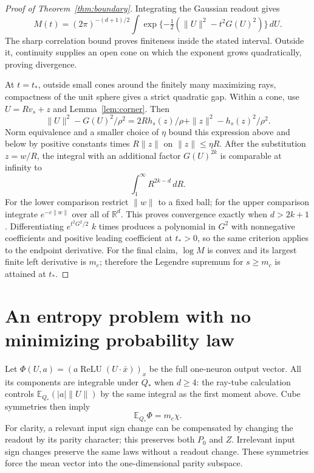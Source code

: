 \documentclass[11pt]{article}
\newcommand{\E}{\mathbb E}
\newcommand{\relu}{\operatorname{ReLU}}
\begin{document}
\begin{proof}[Proof of Theorem~\ref{thm:boundary}]
Integrating the Gaussian readout gives
\[
 M(t)=(2\pi)^{-(d+1)/2}\int
       \exp\{-\tfrac12(\|U\|^2-t^2G(U)^2)\}\,dU.
\]
The sharp correlation bound proves finiteness inside the stated interval.
Outside it, continuity supplies an open cone on which the exponent grows
quadratically, proving divergence.

At $t=t_*$, outside small cones around the finitely many maximizing rays,
compactness of the unit sphere gives a strict quadratic gap. Within a
cone, use $U=Rv_s+z$ and Lemma~\ref{lem:corner}. Then
\[
 \|U\|^2-G(U)^2/\rho^2
 =2Rh_s(z)/\rho+\|z\|^2-h_s(z)^2/\rho^2.
\]
Norm equivalence and a smaller choice of $\eta$ bound this expression
above and below by positive constants times $R\|z\|$ on
$\|z\|\le\eta R$. After the substitution $z=w/R$, the integral with
an additional factor $G(U)^{2k}$ is comparable at infinity to
\[
 \int_1^\infty R^{2k-d}\,dR.
\]
For the lower comparison restrict $\|w\|$ to a fixed ball; for the upper
comparison integrate $e^{-c\|w\|}$ over all of $\mathbb R^d$.
This proves convergence exactly when $d>2k+1$.
Differentiating $e^{t^2G^2/2}$ $k$ times produces a polynomial in $G^2$
with nonnegative coefficients and positive leading coefficient at $t_*>0$,
so the same criterion applies to the endpoint derivative. For the final
claim, $\log M$ is convex and its largest finite left derivative is $m_c$;
therefore the Legendre supremum for $s\ge m_c$ is attained at $t_*$.
\end{proof}

\section{An entropy problem with no minimizing probability law}
Let $\Phi(U,a)=(a\relu(U\cdot\bar x))_x$ be the full one-neuron
output vector. All its components are integrable under $Q_*$ when $d\ge4$:
the ray-tube calculation controls $\E_{Q_*}(|a|\|U\|)$ by the same
integral as the first moment above. Cube symmetries then imply
\[
 \E_{Q_*}\Phi=m_c\chi.
\]
For clarity, a relevant input sign change can be compensated by changing
the readout by its parity character; this preserves both $P_0$ and $Z$.
Irrelevant input sign changes preserve the same laws without a readout
change. These symmetries force the mean vector into the one-dimensional
parity subspace.
\end{document}
